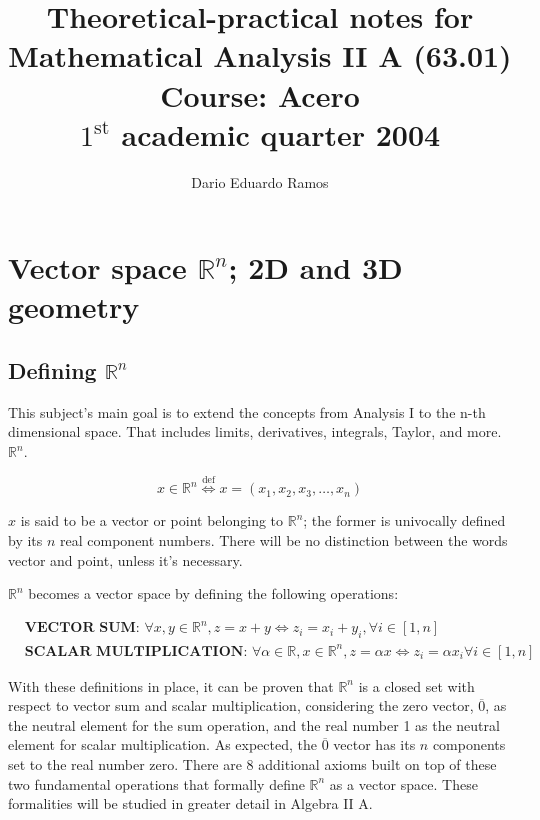 \documentclass{article}
\title{Theoretical-practical notes for \\ Mathematical Analysis II A (63.01) \\ Course: Acero \\ $1^{\text{st}}$ academic quarter 2004}
\author{Dario Eduardo Ramos}
\renewcommand{\Bbb}{\mathbb}
\begin{document}
\maketitle

\tableofcontents{}
\newpage


\section{Vector space \texorpdfstring{$\Bbb R^n$}{Rn}; 2D and 3D geometry}

\subsection{Defining \texorpdfstring{$\Bbb R^n$}{Rn}}

This subject's main goal is to extend the concepts from Analysis I to the n-th dimensional space. That includes limits, derivatives, integrals, Taylor, and more.
$\mathbb{R}^n$.

\begin{equation}
x \in \Bbb R^n \overset{\text{def}}{\Longleftrightarrow} x = (x_1, x_2, x_3, \ldots, x_n)
\end{equation}

$x$ is said to be a vector or point belonging to $\Bbb R^n$; the former is univocally defined by its $n$ real component numbers. There will be no distinction between the words vector and point, unless it's necessary.

$\Bbb R^n$ becomes a vector space by defining the following operations:

\begin{subequations}
\begin{align}
& \textbf{VECTOR SUM: } \forall x, y \in \Bbb R^n, z = x + y \Longleftrightarrow z_i = x_i + y_i, \forall i \in [1, n] \\
& \textbf{SCALAR MULTIPLICATION: } \forall \alpha \in \Bbb R, x \in \Bbb R^n, z = \alpha x \Longleftrightarrow z_i = \alpha x_i \forall i \in [1, n]
\end{align}
\end{subequations}

With these definitions in place, it can be proven that $\Bbb R^n$ is a closed set with respect to vector sum and scalar multiplication, considering the zero vector, $\overline{0}$, as the neutral element for the sum operation, and the real number 1 as the neutral element for scalar multiplication. As expected, the $\overline{0}$ vector has its $n$ components set to the real number zero. There are 8 additional axioms built on top of these two fundamental operations that formally define $\Bbb R^n$ as a vector space. These formalities will be studied in greater detail in Algebra II A.
\end{document}
